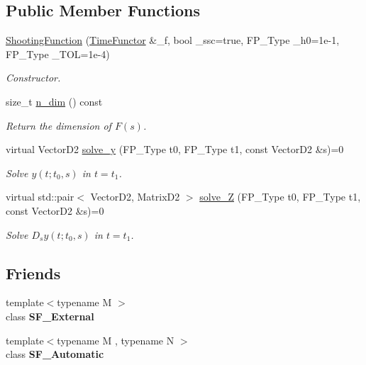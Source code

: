 \subsection*{Public Member Functions}
\begin{DoxyCompactItemize}
\item 
\hyperlink{classShootingFunction_a84f50a64e417a35a9a9c3dc561fbb9a9}{Shooting\+Function} (\hyperlink{classTimeFunctor}{Time\+Functor} \&\+\_\+f, bool \+\_\+ssc=true, F\+P\+\_\+\+Type \+\_\+h0=1e-\/1, F\+P\+\_\+\+Type \+\_\+\+T\+O\+L=1e-\/4)
\begin{DoxyCompactList}\small\item\em Constructor. \end{DoxyCompactList}\item 
\mbox{\label{classShootingFunction_a39e6d5052e9d73ca3f5d4986752525aa}} 
size\+\_\+t \hyperlink{classShootingFunction_a39e6d5052e9d73ca3f5d4986752525aa}{n\+\_\+dim} () const
\begin{DoxyCompactList}\small\item\em Return the dimension of $F(s)$. \end{DoxyCompactList}\item 
\mbox{\label{classShootingFunction_acb29074b32316fdd368d71a775983f81}} 
virtual Vector\+D2 \hyperlink{classShootingFunction_acb29074b32316fdd368d71a775983f81}{solve\+\_\+y} (F\+P\+\_\+\+Type t0, F\+P\+\_\+\+Type t1, const Vector\+D2 \&s)=0
\begin{DoxyCompactList}\small\item\em Solve $y(t; t_0, s)$ in $t = t_1$. \end{DoxyCompactList}\item 
virtual std\+::pair$<$ Vector\+D2, Matrix\+D2 $>$ \hyperlink{classShootingFunction_a41360056996ee70c43c4538acd6e28d8}{solve\+\_\+Z} (F\+P\+\_\+\+Type t0, F\+P\+\_\+\+Type t1, const Vector\+D2 \&s)=0
\begin{DoxyCompactList}\small\item\em Solve $D_s y(t; t_0, s)$ in $t = t_1$. \end{DoxyCompactList}\end{DoxyCompactItemize}
\subsection*{Friends}
\begin{DoxyCompactItemize}
\item 
\mbox{\label{classShootingFunction_a2049a85c938706b17638057b5ead41f5}} 
{\footnotesize template$<$typename M $>$ }\\class {\bfseries S\+F\+\_\+\+External}
\item 
\mbox{\label{classShootingFunction_a6140f660d0ec9a35ac0517afe096cc12}} 
{\footnotesize template$<$typename M , typename N $>$ }\\class {\bfseries S\+F\+\_\+\+Automatic}
\end{DoxyCompactItemize}


